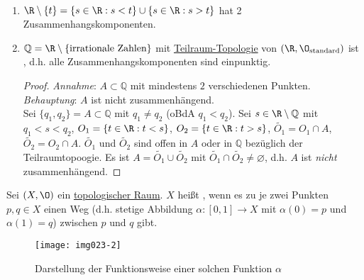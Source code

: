 \begin{example}
  \
  \begin{enumerate}
    \item $ \R \setminus \{ t \} = \{ s \in \R : s < t \} \cup \{ s \in \R : s > t \} $ hat 2 Zusammenhangskomponenten.
    \item $ \mathbb{Q} = \R \setminus \{ \text{irrationale Zahlen} \} $ mit \hyperref[def:teilraumtopologie]{Teilraum-Topologie} von $ (\R, \O_\text{standard}) $ ist , d.h. alle Zusammenhangskomponenten sind einpunktig. \\
    \begin{proof}
      \emph{Annahme}: $ A \subset \mathbb{Q} $ mit mindestens $ 2 $ verschiedenen Punkten. \\
      \emph{Behauptung}: $ A $ ist nicht zusammenhängend. \\
      Sei $ \{ q_1, q_2 \} = A \subset \mathbb{Q} $ mit $ q_1 \neq q_2 $ (oBdA $ q_1 < q_2 $). Sei $ s \in \R \setminus \mathbb{Q} $ mit $ q_1 < s < q_2 $, $ O_1 = \{ t \in \R: t < s \} $, $ O_2 = \{ t \in \R : t > s \} $, $ \widetilde{O_1} = O_1 \cap A $, $ \widetilde{O_2} = O_2 \cap A $. $ \widetilde{O_1} $ und $ \widetilde{O_2} $ sind offen in $ A $ oder in $ \mathbb{Q} $ bezüglich der Teilraumtopoogie. Es ist $ A = \widetilde{O_1} \cup \widetilde{O_2} $ mit $ \widetilde{O_1} \cap \widetilde{O_2} \neq \varnothing $, d.h. $ A $ ist \emph{nicht} zusammenhängend.
    \end{proof}
  \end{enumerate}
\end{example}

\begin{definition}
  \label{def:wegzusammenhaengend}
  Sei $ (X, \O) $ ein \hyperref[def:topologie]{topologischer Raum}. $ X $ heißt , wenn es zu je zwei Punkten $ p, q \in X $ einen Weg (d.h. stetige Abbildung $ \alpha : [0,1] \to X $ mit $ \alpha(0) = p $ und $ \alpha(1) = q $) zwischen $ p $ und $ q $ gibt.
  \begin{figure}[H]
    \label{img023-2}
    \texttt{[image: img023-2]}
    \caption{Darstellung der Funktionsweise einer solchen Funktion $ \alpha $}
  \end{figure}
\end{definition}

